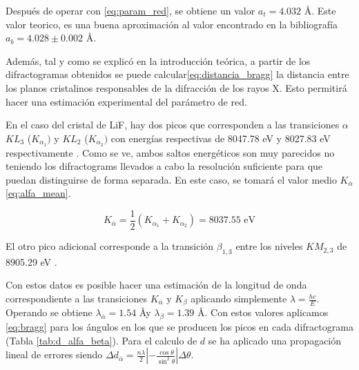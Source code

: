 \vspace{\baselineskip}
Después de operar con \ref{eq:param_red}, se obtiene un valor $a_t=4.032$ \AA. Este valor teorico, es una buena aproximación al valor encontrado en la bibliografía \cite{LiF_str}  $a_b=4.028\pm 0.002$ \AA.


\vspace{\baselineskip}


Además, tal y como se explicó en la introducción teórica, a partir de los difractogramas obtenidos se puede calcular\ref{eq:distancia_bragg} la distancia entre los planos cristalinos responsables de la difracción de los rayos X. Esto permitirá hacer una estimación experimental del parámetro de red.

\vspace{\baselineskip}

En el caso del cristal de LiF, hay dos picos que corresponden a las transiciones $\alpha$ $KL_3$ ($K_{\alpha_1}) $ y  $KL_2$ ($K_{\alpha_2})$  con energías respectivas de 8047.78 eV y 8027.83 eV respectivamente \cite{Bearden1967}. Como se ve, ambos saltos energéticos son muy parecidos no teniendo los difractograms llevados a cabo la resolución suficiente  para que puedan distinguirse de forma separada. En este caso, se tomará el valor medio $K_{\bar\alpha}$ \ref{eq:alfa_mean}.

\begin{equation}\label{eq:alfa_mean}
	K_{\bar\alpha} = \frac{1}{2}\left(K_{\alpha_1} + K_{\alpha_2}\right) = 8037.55 \text{ eV} 
\end{equation}

El otro pico adicional corresponde a la  transición $\beta_{1,3}$ entre los niveles $K M_{2,3}$ de 8905.29 eV \cite{Bearden1967}. 

\vspace{\baselineskip}

Con estos datos es posible hacer una estimación de la longitud de onda correspondiente a las transiciones $K_{\bar\alpha}$ y  $K_{\beta}$ aplicando simplemente $\lambda = \frac{hc}{ E}$. Operando se obtiene $\lambda_{\bar\alpha} = 1.54$ \AA y $\lambda_{\beta} = 1.39$ \AA. Con estos valores aplicamos  \ref{eq:bragg} para los ángulos en los que se producen los picos en cada difractograma  (Tabla \ref{tab:d_alfa_beta}).  Para el calculo de $d$ se ha aplicado una propagación lineal de errores siendo $\Delta d_{\bar{\alpha}} = \frac{n\lambda}{2}\left|-\frac{\cos\theta}{\sin^2\theta}\right|\Delta\theta$. 




